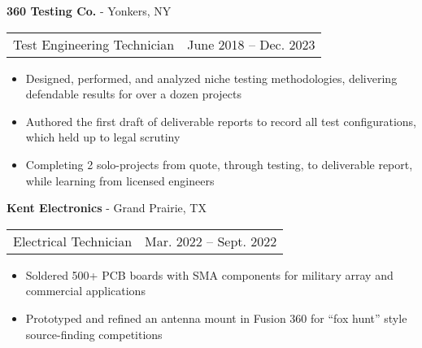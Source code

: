 \documentclass[18pt]{article}
\begin{document}
\vspace{-0.5\baselineskip}
\textbf{360 Testing Co.} - Yonkers, NY 

\begin{tabular}{p{} p{}}
    Test Engineering Technician & \hfill June 2018 – Dec. 2023
\end{tabular}

\begin{itemize}[noitemsep]
    \vspace{-0.5\baselineskip}
    \item Designed, performed, and analyzed niche testing methodologies, delivering defendable results for over a dozen projects
    \item Authored the first draft of deliverable reports to record all test configurations, which held up to legal scrutiny 
    \item Completing 2 solo-projects from quote, through testing, to deliverable report, while learning from licensed engineers
\end{itemize}

\vspace{-0.5\baselineskip}
\textbf{Kent Electronics} - Grand Prairie, TX 

\begin{tabular}{p{} p{}}
    Electrical Technician & \hfill Mar. 2022 – Sept. 2022
\end{tabular}

\begin{itemize}[noitemsep]
    \vspace{-0.5\baselineskip}
    \item Soldered 500+ PCB boards with SMA components for military array and commercial applications
    \item Prototyped and refined an antenna mount in Fusion 360 for “fox hunt” style source-finding competitions
\end{itemize}

\end{document}
